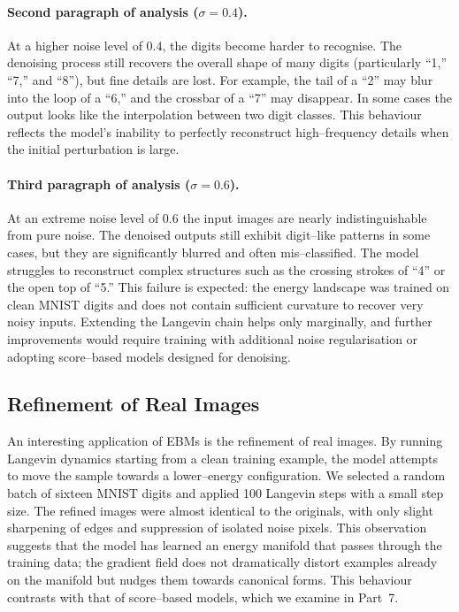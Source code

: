 \paragraph{Second paragraph of analysis (\texorpdfstring{$\sigma=0.4$}{sigma=0.4}).}
At a higher noise level of $0.4$, the digits become harder to recognise.
The denoising process still recovers the overall shape of many digits
(particularly ``1,'' ``7,'' and ``8''), but fine details are lost.  For
example, the tail of a ``2'' may blur into the loop of a ``6,'' and the
crossbar of a ``7'' may disappear.  In some cases the output looks like
the interpolation between two digit classes.  This behaviour reflects the
model's inability to perfectly reconstruct high–frequency details when the
initial perturbation is large.

\paragraph{Third paragraph of analysis (\texorpdfstring{$\sigma=0.6$}{sigma=0.6}).}
At an extreme noise level of $0.6$ the input images are nearly
indistinguishable from pure noise.  The denoised outputs still exhibit
digit–like patterns in some cases, but they are significantly blurred and
often mis–classified.  The model struggles to reconstruct complex
structures such as the crossing strokes of ``4'' or the open top of
``5.''  This failure is expected: the energy landscape was trained on
clean MNIST digits and does not contain sufficient curvature to recover
very noisy inputs.  Extending the Langevin chain helps only marginally,
and further improvements would require training with additional noise
regularisation or adopting score–based models designed for denoising.

\subsection{Refinement of Real Images}

An interesting application of EBMs is the refinement of real images.  By
running Langevin dynamics starting from a clean training example, the model
attempts to move the sample towards a lower–energy configuration.  We
selected a random batch of sixteen MNIST digits and applied 100 Langevin
steps with a small step size.  The refined images were almost identical
to the originals, with only slight sharpening of edges and suppression of
isolated noise pixels.  This observation suggests that the model has
learned an energy manifold that passes through the training data; the
gradient field does not dramatically distort examples already on the
manifold but nudges them towards canonical forms.  This behaviour contrasts
with that of score–based models, which we examine in Part~7.

